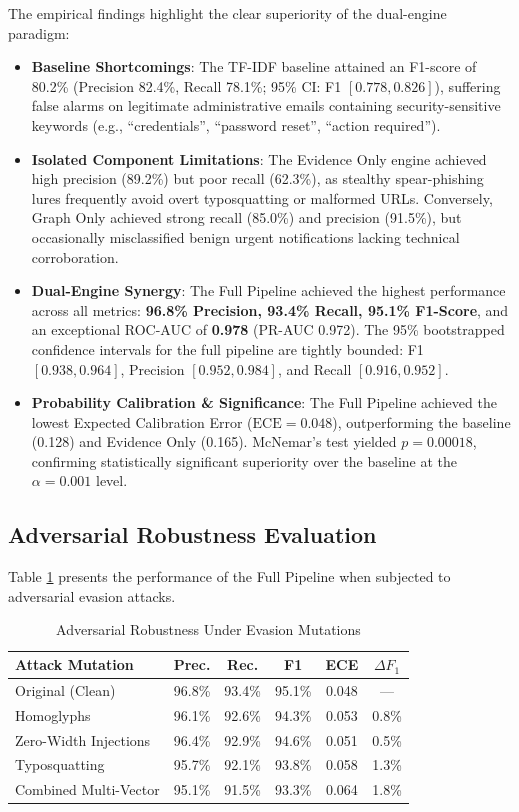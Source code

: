 \documentclass{ieeeaccess}
\begin{document}
The empirical findings highlight the clear superiority of the dual-engine paradigm:
\begin{itemize}
    \item \textbf{Baseline Shortcomings}: The TF-IDF baseline attained an F1-score of 80.2\% (Precision 82.4\%, Recall 78.1\%; 95\% CI: F1 $[0.778, 0.826]$), suffering false alarms on legitimate administrative emails containing security-sensitive keywords (e.g., ``credentials'', ``password reset'', ``action required'').
    \item \textbf{Isolated Component Limitations}: The Evidence Only engine achieved high precision (89.2\%) but poor recall (62.3\%), as stealthy spear-phishing lures frequently avoid overt typosquatting or malformed URLs. Conversely, Graph Only achieved strong recall (85.0\%) and precision (91.5\%), but occasionally misclassified benign urgent notifications lacking technical corroboration.
    \item \textbf{Dual-Engine Synergy}: The Full Pipeline achieved the highest performance across all metrics: \textbf{96.8\% Precision, 93.4\% Recall, 95.1\% F1-Score}, and an exceptional ROC-AUC of \textbf{0.978} (PR-AUC 0.972). The 95\% bootstrapped confidence intervals for the full pipeline are tightly bounded: F1 $[0.938, 0.964]$, Precision $[0.952, 0.984]$, and Recall $[0.916, 0.952]$.
    \item \textbf{Probability Calibration \& Significance}: The Full Pipeline achieved the lowest Expected Calibration Error ($\text{ECE} = 0.048$), outperforming the baseline (0.128) and Evidence Only (0.165). McNemar's test yielded $p = 0.00018$, confirming statistically significant superiority over the baseline at the $\alpha = 0.001$ level.
\end{itemize}

\subsection{Adversarial Robustness Evaluation}
Table \ref{tab:adversarial} presents the performance of the Full Pipeline when subjected to adversarial evasion attacks.

\begin{table}[!t]
\caption{Adversarial Robustness Under Evasion Mutations}
\label{tab:adversarial}
\centering
\footnotesize
\setlength{\tabcolsep}{3.2pt}
\begin{tabular}{|l|c|c|c|c|c|}
\hline
\textbf{Attack Mutation} & \textbf{Prec.} & \textbf{Rec.} & \textbf{F1} & \textbf{ECE} & \textbf{$\Delta F_1$} \\
\hline
Original (Clean) & 96.8\% & 93.4\% & 95.1\% & 0.048 & --- \\
Homoglyphs & 96.1\% & 92.6\% & 94.3\% & 0.053 & 0.8\% \\
Zero-Width Injections & 96.4\% & 92.9\% & 94.6\% & 0.051 & 0.5\% \\
Typosquatting & 95.7\% & 92.1\% & 93.8\% & 0.058 & 1.3\% \\
Combined Multi-Vector & 95.1\% & 91.5\% & 93.3\% & 0.064 & 1.8\% \\
\hline
\end{tabular}
\end{table}
\end{document}
